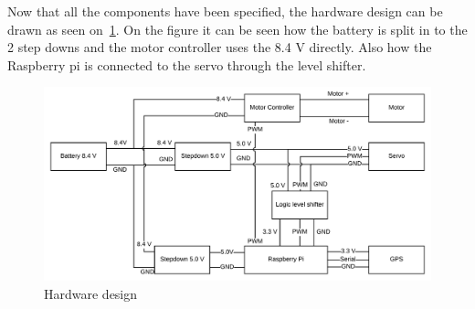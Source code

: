 Now that all the components have been specified, the hardware design can be drawn as seen on~\ref{fig:hardware_design}. On the figure it can be seen how the battery is split in to the 2 step downs and the motor controller uses the 8.4 V directly. Also how the Raspberry pi is connected to the servo through the level shifter.

\begin{figure}[H]
\centering
\includegraphics[width=1\linewidth]{Images/Design/Hardware_design}
\caption{Hardware design}
\label{fig:hardware_design}
\end{figure}


% 
